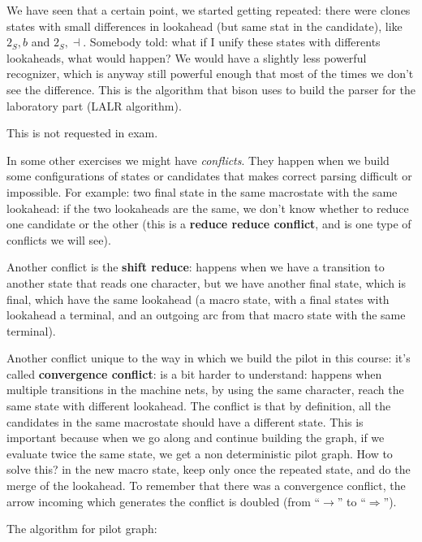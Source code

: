 			We have seen that a certain point, we started getting repeated: there were clones states with small differences in lookahead (but same stat in the 
			candidate), like $2_S,b$ and $2_S,\dashv$. Somebody told: what if I unify these states with differents lookaheads, what would happen? We would have a slightly less
			powerful recognizer, which is anyway still powerful enough that most of the times we don't see the difference. This is the algorithm that bison uses to 
			build the parser for the laboratory part (LALR algorithm).

			This is not requested in exam.

			In some other exercises we might have \emph{conflicts}. They happen when we build some configurations of states or candidates that makes 
			correct parsing difficult or impossible. For example: two final state in the same macrostate with the same lookahead: if the two lookaheads are the 
			same, we don't know whether to reduce one candidate or the other (this is a \textbf{reduce reduce conflict}, and is one type of conflicts we will see).

			Another conflict is the \textbf{shift reduce}: happens when we have a transition to another state that reads one character, but we have another final state, which is final, which have the same 
			lookahead (a macro state, with a final states with lookahead a terminal, and an outgoing arc from that macro state with the same terminal).

			Another conflict unique to the way in which we build the pilot in this course: it's called \textbf{convergence conflict}: is a bit harder to understand:  happens when 
			multiple transitions in the machine nets, by using the same character, reach the same state with different lookahead.
			The conflict is that by definition, all the candidates in the same macrostate should have a different state. This is important because when we go along and continue building 
			the graph, if we evaluate twice the same state, we get a non deterministic pilot graph. How to solve this? in the new macro state, keep only once the repeated 
			state, and do the merge of the lookahead. To remember that there was a convergence conflict, the arrow incoming which generates the conflict is doubled (from 
			``$\rightarrow$'' to ``$\Rightarrow$'').
			
			The algorithm for pilot graph:


